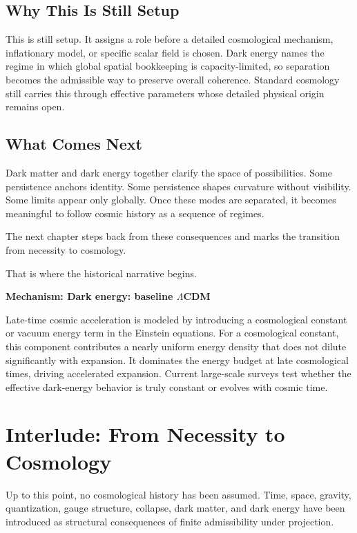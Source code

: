 \documentclass[11pt,twoside,openright]{book}
\newenvironment{mechanismbox}[1]
  {\begin{framed}\noindent\textbf{Mechanism: #1}\par\medskip}
  {\end{framed}}
\begin{document}
\section*{Why This Is Still Setup}

This is still setup. It assigns a role before a detailed cosmological mechanism, inflationary model, or specific scalar field is chosen. Dark energy names the regime in which global spatial bookkeeping is capacity-limited, so separation becomes the admissible way to preserve overall coherence. Standard cosmology still carries this through effective parameters whose detailed physical origin remains open.

\section*{What Comes Next}

Dark matter and dark energy together clarify the space of possibilities. Some persistence anchors identity. Some persistence shapes curvature without visibility. Some limits appear only globally. Once these modes are separated, it becomes meaningful to follow cosmic history as a sequence of regimes.

The next chapter steps back from these consequences and marks the transition from necessity to cosmology.

That is where the historical narrative begins.

\begin{mechanismbox}{Dark energy: baseline $\Lambda$CDM}

Late-time cosmic acceleration is modeled by introducing a cosmological constant or vacuum energy term in the Einstein equations. For a cosmological constant, this component contributes a nearly uniform energy density that does not dilute significantly with expansion. It dominates the energy budget at late cosmological times, driving accelerated expansion. Current large-scale surveys test whether the effective dark-energy behavior is truly constant or evolves with cosmic time.

\end{mechanismbox}
\clearpage
{%
  \let\cleardoublepage\clearpage
  \chapter{Interlude: From Necessity to Cosmology}
}

Up to this point, no cosmological history has been assumed. Time, space, gravity, quantization, gauge structure, collapse, dark matter, and dark energy have been introduced as structural consequences of finite admissibility under projection.
\end{document}
